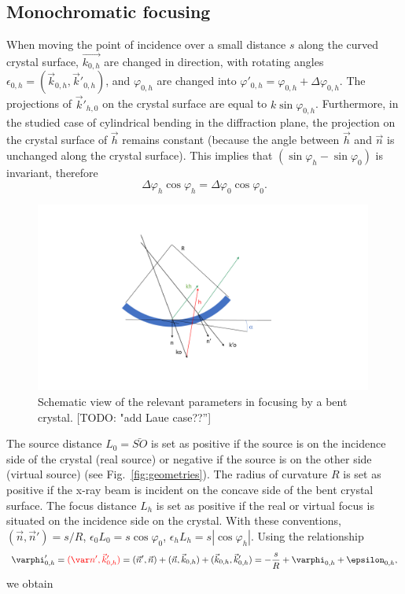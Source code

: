 \documentclass[preprint]{iucr}              %
\newcommand{\todo}[1]{{\color{red}[TODO: "#1'']}}
\newcommand{\inblue}[1]{{\color{blue}#1}}
\newcommand{\inred}[1]{{\color{red}#1}}
\begin{document}
\subsection{Monochromatic focusing}

When moving the point of incidence over a small distance $s$ along the curved crystal surface, $\vec{k_{0,h}}$ are changed in direction, with rotating angles $\epsilon_{0,h} = (\vec k_{0,h},\vec k'_{0,h})$, and $\varphi_{0,h}$ are changed into $\varphi'_{0,h}=\varphi_{0,h}+\Delta \varphi_{0,h}$.
The projections of  $\vec k'_{h,0}$ \inblue{on the crystal surface} are equal to $k\sin\varphi_{0,h}$. Furthermore, in the studied case of cylindrical bending \inblue{in the diffraction plane}, the projection on the crystal surface of $\vec h$ remains constant \inblue{(because the angle between $\vec h$ and $\vec n$ is unchanged along the crystal surface).
}
This implies that $(\sin \varphi_h - \sin \varphi_0)$ is invariant, therefore
\begin{equation}
\label{eq:invariant}
    \Delta \varphi_h \cos\varphi_h = \Delta \varphi_0 \cos\varphi_0.
\end{equation}

\begin{figure}
\label{fig:vectors}
\caption{Schematic view of the relevant parameters in focusing by a bent crystal. \todo{add Laue case??}
}
\includegraphics[width=0.99\textwidth,trim=5cm 2cm 10cm 2cm,clip=true]{fig_vectors.pdf}
\end{figure}

The source distance $L_0=\bar{SO}$ is set as positive if the source is on the incidence side of the crystal (real source) or negative if the source is on the other side (virtual source) (see Fig.~\ref{fig:geometries}). The radius of curvature $R$ is set as positive if the x-ray beam is incident on the concave side of the bent crystal surface. The focus distance $L_h$ is set as positive if the real or virtual focus is situated on the incidence side on the crystal. With these conventions, $(\vec n,\vec n')=s/R$, $\epsilon_0 L_0 = s \cos\varphi_0$,  $\epsilon_h L_h = s |\cos\varphi_h|$. Using the relationship
\begin{equation}
    \varphi'_{0,h} = 
    \inred{(\var n',  \vec k'_{0,h})} = 
    (\vec n', \vec n) + (\vec n,\vec k_{0,h}) + (\vec k_{0,h}, \vec k'_{0,h}) = -\frac{s}{R} + \varphi_{0,h} + \epsilon_{0,h},
\end{equation}
we obtain
\end{document}
